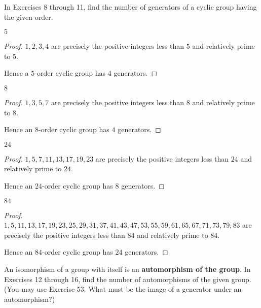 In Exercises 8 through 11, find the number of generators of a cyclic group having the given order.

\begin{exercise}
    $5$
\end{exercise}

\begin{proof}
    $1, 2, 3, 4$ are precisely the positive integers less than $5$ and relatively prime to $5$.

    Hence a $5$-order cyclic group has $4$ generators.
\end{proof}

\begin{exercise}
    $8$
\end{exercise}

\begin{proof}
    $1, 3, 5, 7$ are precisely the positive integers less than $8$ and relatively prime to $8$.

    Hence an $8$-order cyclic group has $4$ generators.
\end{proof}

\begin{exercise}
    $24$
\end{exercise}

\begin{proof}
    $1, 5, 7, 11, 13, 17, 19, 23$ are precisely the positive integers less than $24$ and relatively prime to $24$.

    Hence an $24$-order cyclic group has $8$ generators.
\end{proof}

\begin{exercise}
    $84$
\end{exercise}

\begin{proof}
    $1, 5, 11, 13, 17, 19, 23, 25, 29, 31, 37, 41, 43, 47, 53, 55, 59, 61, 65, 67, 71, 73, 79, 83$ are precisely the positive integers less than $84$ and relatively prime to $84$.

    Hence an $84$-order cyclic group has $24$ generators.
\end{proof}

An isomorphism of a group with itself is an \textbf{automorphism of the group}. In Exercises 12 through 16, find the number of automorphisms of the given group. (You may use Exercise 53. What must be the image of a generator under an automorphism?)


